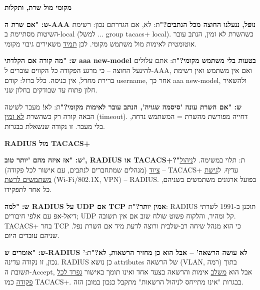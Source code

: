\documentclass[11pt]{article}
\newcommand{\enLR}[1]{\textenglish{#1}}
\newcommand{\code}[1]{\textenglish{\codefont #1}}
\newcommand{\subheading}[1]{\vskip6pt{\bfseries\color{h3}#1\par}\vskip2pt}
\begin{document}
\subheading{מקומי מול שרת, ותקלות}

\textbf{ש: "אם שרת ה-\enLR{AAA} נופל, ננעלנו החוצה מכל הנתבים?"}\newline ת: לא, אם הגדרתם נכון: רשימת השיטות מסתיימת ב-\code{local} (למשל \code{... group tacacs+ local}). כשהשרת לא זמין, הנתב עובר אוטומטית לאימות מול משתמש מקומי. לכן \underline{תמיד} משאירים גיבוי מקומי.\par

\textbf{ש: "מה קורה אם הקלדתי \code{aaa new-model} בטעות בלי משתמש מקומי?"}\newline ת: אתם עלולים להינעל החוצה – כי מרגע הפקודה כל הקווים עוברים ל-\enLR{AAA}, ואם אין משתמש ואין רשימת ברירת מחדל, אין כניסה. כלל ברזל: קודם \code{username}, אחר כך \code{aaa new-model}, ולהשאיר חלון פתוח עד שבודקים בחלון שני.\par

\textbf{ש: "אם השרת עונה 'סיסמה שגויה', הנתב עובר לאימות מקומי?"}\newline ת: לא! מעבר לשיטה הבאה קורה רק כשהשרת \underline{לא זמין} \enLR{(timeout).} דחייה מפורשת מהשרת = המשתמש נדחה, בלי מעבר. זו נקודה שנשאלת בבגרות.\par

\subheading{\enLR{RADIUS} מול \enLR{TACACS}+}

\textbf{ש: "אז איזה מהם 'יותר טוב', \enLR{RADIUS} או \enLR{TACACS}+?"}\newline ת: תלוי במשימה. ל\underline{ניהול ציוד} (מנהלים שמתחברים לנתבים, עם אישור לכל פקודה) – \enLR{TACACS}+ עדיף. ל\underline{גישת משתמשים לרשת} \enLR{(Wi-Fi/802.1X, VPN)} – \enLR{RADIUS.} בפועל ארגונים משתמשים בשניהם, כל אחד לתפקידו.\par

\textbf{ש: "למה \enLR{RADIUS} על \enLR{UDP} אם \enLR{TCP} אמין יותר?"}\newline ת: \enLR{RADIUS} תוכנן ב-\enLR{1991} לשרתי דיאל-אפ עם אלפי חיבורים; \enLR{UDP} קל ומהיר, והלקוח פשוט שולח שוב אם אין תשובה. \enLR{TACACS}+ בחר \enLR{TCP} כי הוא מנהל שיחה רב-שלבית ורוצה לדעת מיד אם השרת נפל. שניהם עובדים היום.\par

\textbf{ש: "אומרים ש-\enLR{RADIUS '}לא עושה הרשאה' – אבל הוא כן מחזיר הרשאות, לא?"}\newline ת: נכון, זו נקודה עדינה. \enLR{RADIUS} כן נושא \enLR{attributes} של הרשאה \enLR{(VLAN}, רמה) בתוך תשובת ה-\enLR{Accept}, אבל הוא \underline{משלב} אימות והרשאה בצעד אחד ואינו תומך באישור \underline{נפרד לכל פקודה} כמו \enLR{TACACS+.} בבגרות "אינו מתייחס לניהול הרשאות" מתקבל כנכון במובן הזה.\par
\end{document}
